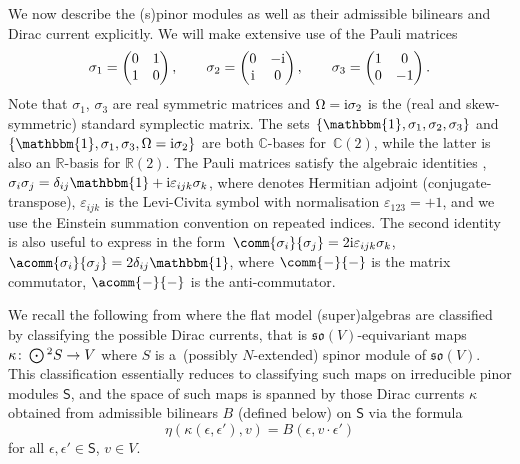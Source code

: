 \documentclass[10pt,a4paper]{amsart}
\numberwithin{equation}{section}
\newcommand{\fso}{\mathfrak{so}}
\newcommand{\RR}{\mathbb{R}}
\newcommand{\CC}{\mathbb{C}}
\newcommand{\ssS}{\mathsf{S}}
\newcommand{\Odot}{\mathchoice{{\textstyle\bigodot}}{\bigodot}{\bigodot}{\bigodot}}
\newcommand{\1}{\mathbbm{1}}
\begin{document}
We now describe the (s)pinor modules as well as their admissible bilinears and Dirac current explicitly. We will make extensive use of the Pauli matrices
\[%
	\sigma_1 = \begin{pmatrix} 0 & 1 \\ 1 & 0 \end{pmatrix},
	\qquad\sigma_2 = \begin{pmatrix} 0 & -{\rm i} \\ {\rm i} & 0 \end{pmatrix},
	\qquad \sigma_3 = \begin{pmatrix} 1 & 0 \\ 0 & -1 \end{pmatrix}.
\]
Note that $\sigma_1$, $\sigma_3$ are real symmetric matrices and $\Omega = {\rm i}\sigma_2$ is the (real and skew-symmetric) standard symplectic matrix. The sets $\{\1,\sigma_1,\sigma_2,\sigma_3\}$ and $\{\1,\sigma_1,\sigma_3,\Omega={\rm i}\sigma_2\}$ are both $\CC$-bases for~$\CC(2)$, while the latter is also an $\RR$-basis for $\RR(2)$. The Pauli matrices satisfy the algebraic identities
,
$ \sigma_i \sigma_j = \delta_{ij}\1 + {\rm i}\varepsilon_{ijk}\sigma_k$,
where \smash{${}^\dagger$} denotes Hermitian adjoint (conjugate-transpose), $\varepsilon_{ijk}$ is the Levi-Civita symbol with normalisation $\varepsilon_{123}=+1$, and we use the Einstein summation convention on repeated indices. The second identity is also useful to express in the form~${\comm{\sigma_i}{\sigma_j} = 2{\rm i}\varepsilon_{ijk}\sigma_k}$,
$\acomm{\sigma_i}{\sigma_j} = 2\delta_{ij}\1$,
where $\comm{-}{-}$ is the matrix commutator, $\acomm{-}{-}$ is the anti-commutator.

We recall the following from \cite{Alekseevsky1997} where the flat model (super)algebras are classified by classifying the possible Dirac currents, that is $\fso(V)$-equivariant maps $\kappa\colon\Odot^2S\to V$ where $S$ is a~(possibly $N$-extended) spinor module of $\fso(V)$. This classification essentially reduces to classifying such maps on irreducible pinor modules $\ssS$, and the space of such maps is spanned by those Dirac currents $\kappa$ obtained from admissible bilinears $B$ (defined below) on $\ssS$ via the formula
\begin{equation}\label{eq:current-bilinear-corresp}
	\eta(\kappa(\epsilon,\epsilon'),v) = B(\epsilon,v\cdot\epsilon')
\end{equation}
for all $\epsilon,\epsilon'\in\ssS$, $v\in V$.
\end{document}
